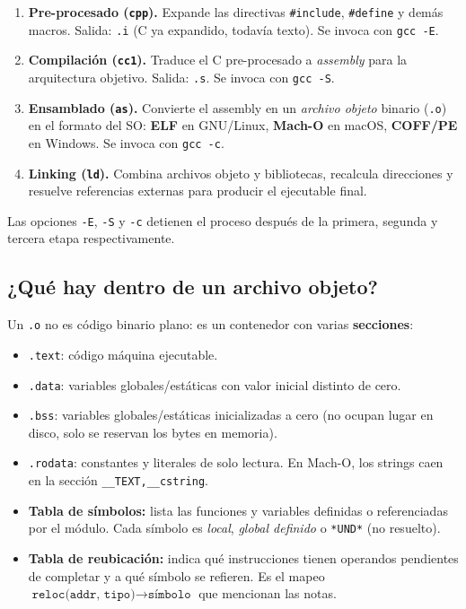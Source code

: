\documentclass[11pt,a4paper]{article}
\begin{document}
\begin{enumerate}[leftmargin=*]
    \item \textbf{Pre-procesado (\texttt{cpp}).} Expande las
        directivas \texttt{\#include}, \texttt{\#define} y demás
        macros. Salida: \texttt{.i} (C ya expandido, todavía texto).
        Se invoca con \texttt{gcc -E}.
    \item \textbf{Compilación (\texttt{cc1}).} Traduce el C
        pre-procesado a \emph{assembly} para la arquitectura objetivo.
        Salida: \texttt{.s}. Se invoca con \texttt{gcc -S}.
    \item \textbf{Ensamblado (\texttt{as}).} Convierte el assembly en
        un \emph{archivo objeto} binario (\texttt{.o}) en el formato
        del SO: \textbf{ELF} en GNU/Linux, \textbf{Mach-O} en macOS,
        \textbf{COFF/PE} en Windows. Se invoca con \texttt{gcc -c}.
    \item \textbf{Linking (\texttt{ld}).} Combina archivos objeto y
        bibliotecas, recalcula direcciones y resuelve referencias
        externas para producir el ejecutable final.
\end{enumerate}

Las opciones \texttt{-E}, \texttt{-S} y \texttt{-c} detienen el
proceso después de la primera, segunda y tercera etapa
respectivamente.

\subsection*{¿Qué hay dentro de un archivo objeto?}

Un \texttt{.o} no es código binario plano: es un contenedor con varias
\textbf{secciones}:

\begin{itemize}[leftmargin=*]
    \item \texttt{.text}: código máquina ejecutable.
    \item \texttt{.data}: variables globales/estáticas con valor
        inicial distinto de cero.
    \item \texttt{.bss}: variables globales/estáticas inicializadas a
        cero (no ocupan lugar en disco, solo se reservan los bytes en
        memoria).
    \item \texttt{.rodata}: constantes y literales de solo lectura.
        En Mach-O, los strings caen en la sección
        \texttt{\_\_TEXT,\_\_cstring}.
    \item \textbf{Tabla de símbolos:} lista las funciones y variables
        definidas o referenciadas por el módulo. Cada símbolo es
        \textit{local}, \textit{global definido} o \texttt{*UND*} (no
        resuelto).
    \item \textbf{Tabla de reubicación:} indica qué instrucciones
        tienen operandos pendientes de completar y a qué símbolo se
        refieren. Es el mapeo $\texttt{reloc(addr, tipo)} \to
        \texttt{símbolo}$ que mencionan las notas.
\end{itemize}
\end{document}

